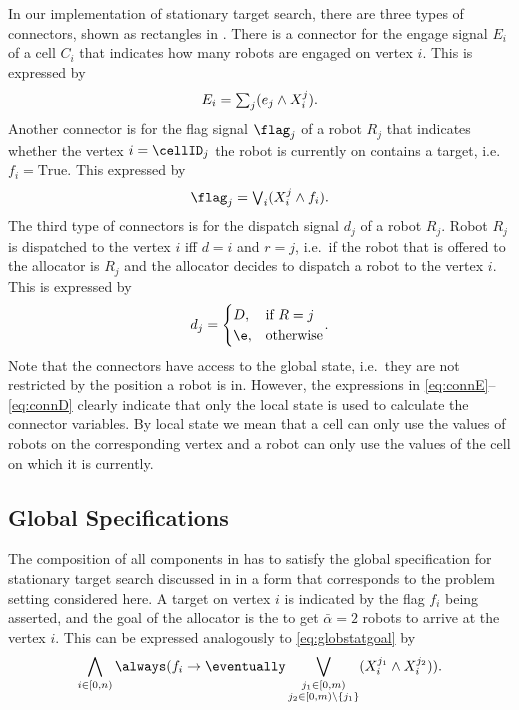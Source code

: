 In our implementation of stationary target search, there are three types of connectors, shown as rectangles in . There is a connector for the engage signal $E_i$ of a cell $C_i$ that indicates how many robots are engaged on vertex $i$. This is expressed by
\begin{equation}
  \textstyle{E_{i} = \sum_{j}(e_j \wedge X^j_{i})}.
  \label{eq:connE}
\end{equation}
Another connector is for the flag signal $\flag_j$ of a robot $R_j$ that indicates whether the vertex $i = \cellID_j$ the robot is currently on contains a target, i.e.\ $f_i = \mathrm{True}$. This expressed by
\begin{equation}
  \connF{j}.
  \label{eq:connF}
\end{equation}
The third type of connectors is for the dispatch signal $d_j$ of a robot $R_j$. Robot $R_j$ is dispatched to the vertex $i$ iff $d = i$ and $r = j$, i.e.\ if the robot that is offered to the allocator is $R_j$ and the allocator decides to dispatch a robot to the vertex $i$. This is expressed by
\begin{equation}
	\connD{j}.
	\label{eq:connD}
\end{equation}
Note that the connectors have access to the global state, i.e.\ they are not restricted by the position a robot is in. However, the expressions in \eqref{eq:connE}--\eqref{eq:connD} clearly indicate that only the local state is used to calculate the connector variables. By local state we mean that a cell can only use the values of robots on the corresponding vertex and a robot can only use the values of the cell on which it is currently.\\



\subsection{Global Specifications} 

The composition of all components in  has to satisfy the global specification for stationary target search discussed in  in a form that corresponds to the problem setting considered here. A target on vertex $i$ is indicated by the flag $f_i$ being asserted, and the goal of the allocator is the to get $\bar{\alpha} = 2$ robots to arrive at the vertex $i$. This can be expressed analogously to \eqref{eq:globstatgoal} by
\begin{equation*}
	\bigwedge_{i \in [0, n)}\always(f_i \rightarrow \eventually\bigvee_{\substack{j_1 \in [0, m) \\ j_2 \in [0, m) \backslash \{j_1\}}}(X_i^{j_1} \wedge X_i^{j_2})).
\end{equation*}

